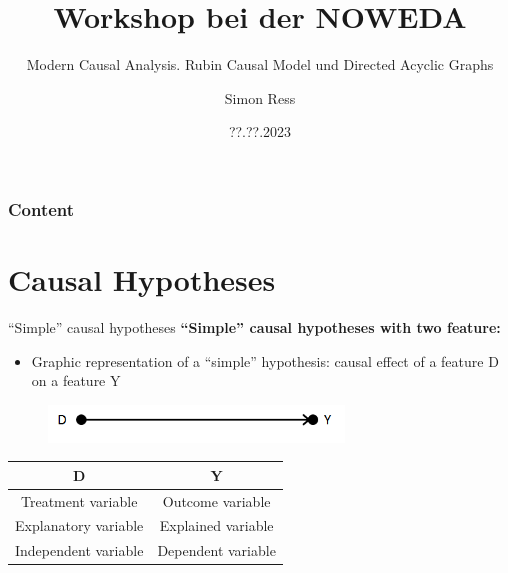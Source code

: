\documentclass{beamer}\usepackage[]{graphicx}\usepackage[]{xcolor}
\author{Simon Ress}
\institute{Ruhr-Universität Bochum}
\title{Workshop bei der NOWEDA}
\subtitle{Modern Causal Analysis. Rubin Causal Model und Directed Acyclic Graphs}
\date{??.??.2023}
\begin{document}

\maketitle

\begin{frame}
\frametitle{Content} 
\tableofcontents
\end{frame}


\section{Causal Hypotheses} %


\begin{frame}{“Simple” causal hypotheses}
\textbf{“Simple” causal hypotheses with two feature:}
  \begin{itemize}
    \item Graphic representation of a “simple” hypothesis: causal effect of a feature D on a feature Y
  \end{itemize}
  \begin{figure}
	\centering
	\includegraphics[width=0.7\textwidth]{Graphics/D_on_Y.png}
  \end{figure}
  
  \begin{table}[]
    \begin{tabular}{cc}
    \hline \hline
    \textbf{D}           & \textbf{Y}         \\ \hline
    Treatment variable   & Outcome variable   \\
    Explanatory variable  & Explained variable  \\
    Independent variable & Dependent variable \\ \hline \hline
    \end{tabular}
  \end{table}
  
\end{frame}
\end{document}
